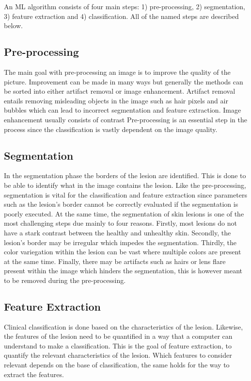 \documentclass{kththesis}
\begin{document}
An ML algorithm consists of four main steps: 1) pre-processing, 2) segmentation, 3) feature extraction and 4) classification. All of the named steps are described below.

\subsection{Pre-processing}

The main goal with pre-processing an image is to improve the quality of the picture. Improvement can be made in many ways but generally the methods can be sorted into either artifact removal or image enhancement. %
Artifact removal entails removing misleading objects in the image such as hair pixels and air bubbles which can lead to incorrect segmentation and feature extraction. Image enhancement usually consists of contrast Pre-processing is an essential step in the process since the classification is vastly dependent on the image quality. %

\subsection{Segmentation}

In the segmentation phase the borders of the lesion are identified. This is done to be able to identify what in the image contains the lesion. Like the pre-processing, segmentation is vital for the classification and feature extraction since parameters such as the lesion’s border cannot be correctly evaluated if the segmentation is poorly executed. At the same time, the segmentation of skin lesions is one of the most challenging steps due mainly to four reasons. Firstly, most lesions do not have a stark contrast between the healthy and unhealthy skin. Secondly, the lesion’s border may be irregular which impedes the segmentation. Thirdly, the color variegation %
within the lesion can be vast where multiple colors are present at the same time. Finally, there may be artifacts such as hairs or lens flare present within the image which hinders the segmentation, this is however meant to be removed during the pre-processing. %

\subsection{Feature Extraction}

Clinical classification is done based on the characteristics of the lesion. Likewise, the features of the lesion need to be quantified in a way that a computer can understand to make a classification. This is the goal of feature extraction, to quantify the relevant characteristics of the lesion. Which features to consider relevant depends on the base of classification, the same holds for the way to extract the features.
\end{document}
